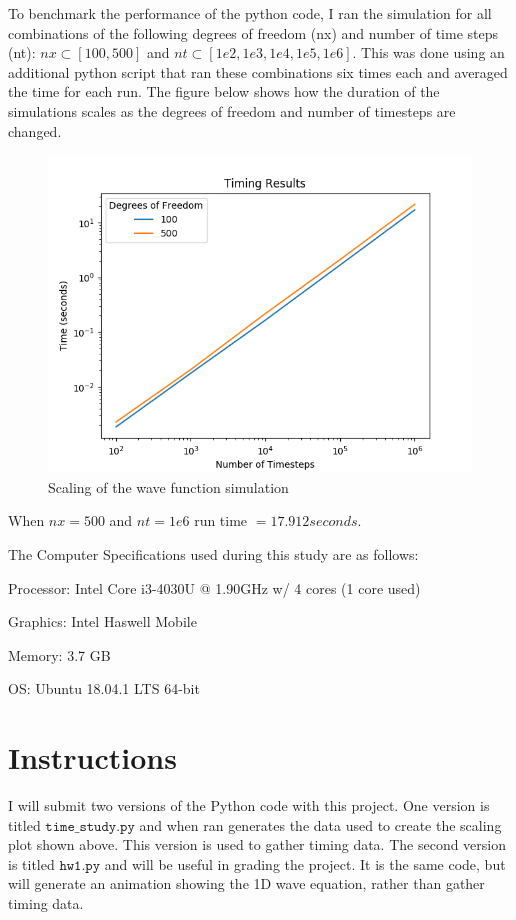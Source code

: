 \documentclass[letterpaper,11pt]{article}
\begin{document}
To benchmark the performance of the python code, I ran the simulation for all combinations of the following degrees of freedom (nx) and number of time steps (nt): $nx \subset [100, 500]$ and $nt \subset [1e2, 1e3, 1e4, 1e5, 1e6]$.  This was done using an additional python script that ran these combinations six times each and averaged the time for each run.  The figure below shows how the duration of the simulations scales as the degrees of freedom and number of timesteps are changed.
\begin{figure}[H]
  \includegraphics[scale=0.9]{timing_results.png}
  \caption{Scaling of the wave function simulation}
\end{figure}

When $nx=500$ and $nt=1e6$ run time $= 17.912 seconds$.
\newline

The Computer Specifications used during this study are as follows:

Processor: Intel Core i3-4030U @ 1.90GHz w/ 4 cores (1 core used)

Graphics: Intel Haswell Mobile

Memory: 3.7 GB

OS: Ubuntu 18.04.1 LTS 64-bit


\section{Instructions}

I will submit two versions of the Python code with this project.  One version is titled $\texttt{time\_study.py}$ and when ran generates the data used to create the scaling plot shown above.  This version is used to gather timing data.  The second version is titled $\texttt{hw1.py}$ and will be useful in grading the project.  It is the same code, but will generate an animation showing the 1D wave equation, rather than gather timing data.
\end{document}
